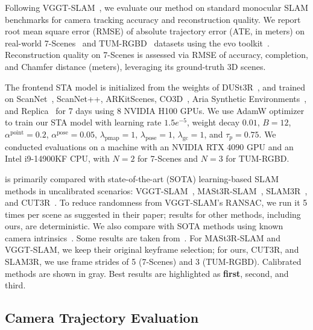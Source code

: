 Following VGGT-SLAM~\cite{maggio2025vggtslam}, we evaluate our method on standard monocular SLAM benchmarks for camera tracking accuracy and reconstruction quality. We report root mean square error (RMSE) of absolute trajectory error (ATE, in meters) on real-world 7-Scenes~\cite{shotton2013-7scenes} and TUM-RGBD~\cite{sturm12tumrgbd} datasets using the evo toolkit~\cite{grupp2017evo}. Reconstruction quality on 7-Scenes is assessed via RMSE of accuracy, completion, and Chamfer distance (meters), leveraging its ground-truth 3D scenes.

The frontend STA model is initialized from the weights of DUSt3R~\cite{dust3r}, and trained on  ScanNet~\cite{dai2017scannet}, ScanNet++\cite{yeshwanthliu2023scannetpp}, ARKitScenes\cite{dehghan2021arkitscenes}, CO3D~\cite{reizenstein21co3d}, Aria Synthetic Environments~\cite{avetisyan2024ase}, and Replica~\cite{replica19arxiv} for 7 days using 8 NVIDIA H100 GPUs.
We use AdamW optimizer to train our STA model with learning rate $1.5e^{-5}$, weight decay $0.01$, $B=12$, $\alpha^{\text{point}}=0.2$, $\alpha^{\text{pose}}=0.05$, $\lambda_{\text{pmap}}=1$, $\lambda_{\text{pose}}=1$, $\lambda_{\text{gc}}=1$, and $\tau_p = 0.75$. We conducted evaluations on a machine with an NVIDIA RTX 4090 GPU and an Intel i9-14900KF CPU, with $N=2$ for 7-Scenes and $N=3$ for TUM-RGBD.


\ours is primarily compared with state-of-the-art (SOTA) learning-based SLAM methods in uncalibrated scenarios: VGGT-SLAM~\cite{maggio2025vggtslam}, MASt3R-SLAM~\cite{murai2025mast3rslam}, SLAM3R~\cite{liu2025slam3r}, and CUT3R~\cite{wang2025cut3r}. To reduce randomness from VGGT-SLAM’s RANSAC, we run it 5 times per scene as suggested in their paper; results for other methods, including ours, are deterministic. We also compare with SOTA methods using known camera intrinsics~\cite{campos2021orb,zhu2024nicer,zhang2024glorie,teed2021droid,lipson2024dpvslam}. Some results are taken from~\cite{murai2025mast3rslam,maggio2025vggtslam}. For MASt3R-SLAM and VGGT-SLAM, we keep their original keyframe selection; for ours, CUT3R, and SLAM3R, we use frame strides of 5 (7-Scenes) and 3 (TUM-RGBD). Calibrated methods are shown in {\lo gray}. Best results are highlighted as \colorbox{colorFst}{\bf first}, \colorbox{colorSnd}{second}, and \colorbox{colorTrd}{third}.

\subsection{Camera Trajectory Evaluation}
\label{subsec:traj}



